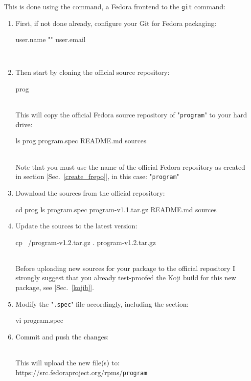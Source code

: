 This is done using the  command, a Fedora frontend to the \texttt{git} command:
\begin{enumerate}
\item First, if not done already, configure your Git for Fedora packaging: 
{\small{
\begin{scripti}
\fprompt{~}    user.name ""
\fprompt{~}    user.email \dctt{\email}
\end{scripti}}}
\\[-0.75cm]
\item Then start by cloning the official source repository: 
\begin{scripti}
\fprompt{~}   prog
\end{scripti}
\\[-0.75cm]
\noindent This will copy the official Fedora source repository of "\texttt{program}" to your hard drive:
\begin{scripti}
\fprompt{~} ls prog
program.spec README.md sources
\fprompt{~}
\end{scripti}
\\[-0.75cm]
\noindent Note that you must use the name of the official Fedora repository as created in section [Sec.~\ref{create_frepo}], in this case: "\texttt{program}"  
\item Download the sources from the official repository:  
\begin{scripti}
\fprompt{~} cd prog
  
 ls
program.spec program-v1.1.tar.gz README.md sources
\end{scripti}
\item Update the sources to the latest version:
\begin{scripti}
 cp ~/program-v1.2.tar.gz .
   program-v1.2.tar.gz
\end{scripti}
\\[-0.75cm]
\noindent Before uploading new sources for your package to the official repository I strongly suggest that you already 
test-proofed the Koji build for this new package, see [Sec.~\ref{kojib}]. 
\item Modify the "\texttt{.spec}" file accordingly, including the  section:
\begin{scripti}
 vi program.spec 
\end{scripti}
\item Commit and push the changes:
\begin{scripti}
   
\end{scripti}
\\[-0.75cm]
\noindent This will upload the new file(s) to: https://src.fedoraproject.org/rpms/\texttt{program}
\end{enumerate}

